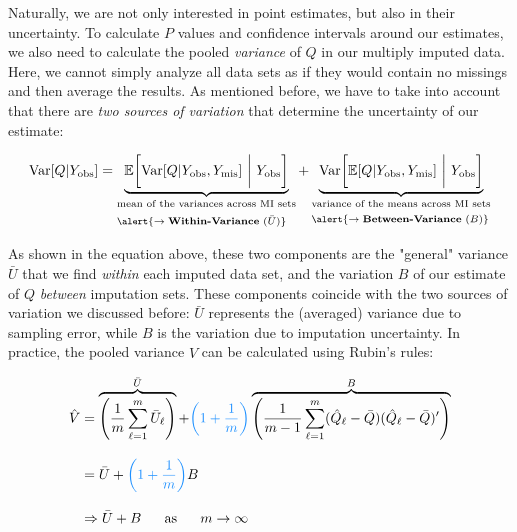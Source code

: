 Naturally, we are not only interested in point estimates, but also in their uncertainty. To calculate $P$ values and confidence intervals around our estimates, we also need to calculate the pooled \emph{variance} of $Q$ in our multiply imputed data. Here, we cannot simply analyze all data sets as if they would contain no missings and then average the results. As mentioned before, we have to take into account that there are \emph{two sources of variation} that determine the uncertainty of our estimate:

\begin{equation}
\mathrm{Var}[Q|Y_{\text{obs}}] = \underbrace{\mathbb{E}\bigg[\mathrm{Var}[Q|Y_{\text{obs}}, Y_{\text{mis}}]~ \bigg| ~ Y_{\text{obs}} \bigg]}_{\scriptsize \begin{split} &\text{mean of the variances across MI sets} \\ & \alert{\rightarrow \textbf{Within-Variance}~(\bar{{U}})} \end{split}} + \underbrace{\mathrm{Var}\bigg[ \mathbb{E}[Q|Y_{\text{obs}}, Y_{\text{mis}}]~\bigg|~ Y_{\text{obs}}\bigg]}_{\scriptsize \begin{split} &\text{variance of the means across MI sets} \\ & \alert{\rightarrow \textbf{Between-Variance}~(B)} \end{split}}
\end{equation}

As shown in the equation above, these two components are the "general" variance $\bar U$ that we find \emph{within} each imputed data set, and the variation $B$ of our estimate of $Q$ \emph{between} imputation sets. These components coincide with the two sources of variation we discussed before: $\bar U$ represents the (averaged) variance due to sampling error, while $B$ is the variation due to imputation uncertainty. In practice, the pooled variance $\hat V$ can be calculated using Rubin's rules: 

\begin{equation}
\openup 3\jot
\begin{split}
\hat{V} & = \overbrace{ \left(\frac{1}{m}\sum^{m}_{\ell=1}\bar{U}_\ell\right)}^{\bar{U}} + \textcolor{dodgerblue}{\left(1+\frac{1}{m}\right) }\overbrace{ \left(\frac{1}{m-1}\sum_{\ell=1}^m (\hat Q_\ell-\bar Q)(\hat Q_\ell-\bar Q)'\right)}^{B} \\
& = \bar{U} + \textcolor{dodgerblue}{\left(1+\frac{1}{m}\right)}B \\
& \Rightarrow \bar{U} + B ~~~~~\text{as}~~~~~m \rightarrow \infty
\end{split}
\end{equation}

